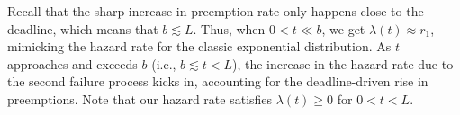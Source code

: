 


Recall that the sharp increase in preemption rate only happens close to the deadline, which means that $b \lesssim L$. Thus, when $0 < t \ll b$, we get $\lambda(t) \approx r_1$, mimicking the hazard rate for the classic exponential distribution.
As $t$ approaches and exceeds $b$ (i.e., $b\lesssim t < L$), the increase in the hazard rate due to the second failure process kicks in, accounting for the deadline-driven rise in preemptions. Note that our hazard rate satisfies $\lambda(t) \ge 0$ for $0<t<L$.


% 





